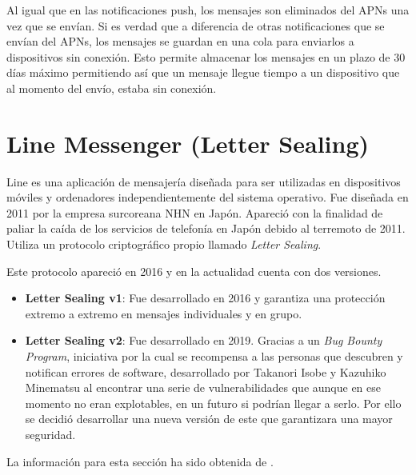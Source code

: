 Al igual que en las notificaciones push, los mensajes son eliminados del APNs una vez que se envían. Si es verdad que a diferencia de otras notificaciones que se envían del APNs, los mensajes se guardan en una cola para enviarlos a dispositivos sin conexión. Esto permite almacenar los mensajes en un plazo de 30 días máximo permitiendo así que un mensaje llegue tiempo a un dispositivo que al momento del envío, estaba sin conexión.

\section{Line Messenger (Letter Sealing)}
Line es una aplicación de mensajería diseñada para ser utilizadas en dispositivos móviles y ordenadores independientemente del sistema operativo. Fue diseñada en 2011 por la empresa surcoreana NHN en Japón.
Apareció con la finalidad de paliar la caída de los servicios de telefonía en Japón debido al terremoto de 2011. Utiliza un protocolo criptográfico propio llamado \emph{Letter Sealing}.

Este protocolo apareció en 2016 y en la actualidad cuenta con dos versiones.
\begin{itemize}
	\item \textbf{Letter Sealing v1}: Fue desarrollado en 2016 y garantiza una protección extremo a extremo en mensajes individuales y en grupo.
	\item \textbf{Letter Sealing v2}: Fue desarrollado en 2019. Gracias a un \emph{Bug Bounty  Program}, iniciativa por la cual se recompensa a las personas que descubren y notifican errores de software,  desarrollado por Takanori Isobe y Kazuhiko Minematsu al encontrar una serie de vulnerabilidades que aunque en ese momento no eran explotables, en un futuro si podrían llegar a serlo. Por ello se decidió desarrollar una nueva versión de este que garantizara una mayor seguridad.
\end{itemize}
La información para esta sección ha sido obtenida de \cite{line}.
\begin{table}[htb]
	\label{table:lsv}
	\caption{Tabla comparativa de versiones de Letter Sealing.}
\end{table}

